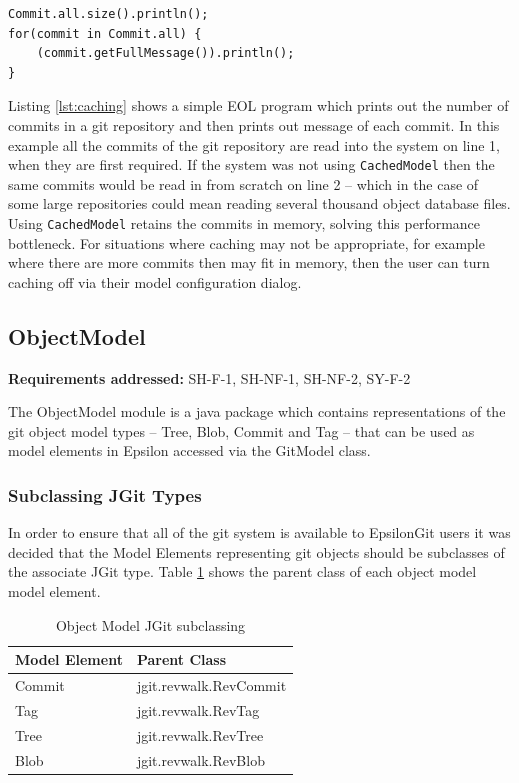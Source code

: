 \documentclass[11pt]{book}
\newcommand{\code}[1]{\texttt{#1}}
\begin{document}
\begin{lstlisting}[caption=EOL Code benefiting from caching, label=lst:caching]
Commit.all.size().println();
for(commit in Commit.all) {
	(commit.getFullMessage()).println();
}
\end{lstlisting}

Listing \ref{lst:caching} shows a simple EOL program which prints out the number of commits in a git repository and then prints out message of each commit. In this example all the commits of the git repository are read into the system on line 1, when they are first required. If the system was not using \code{CachedModel} then the same commits would be read in from scratch on line 2 -- which in the case of some large repositories could mean reading several thousand object database files. Using \code{CachedModel} retains the commits in memory, solving this performance bottleneck. For situations where caching may not be appropriate, for example where there are more commits then may fit in memory, then the user can turn caching off via their model configuration dialog.

\subsection{ObjectModel}
\begin{tcolorbox}
\textbf{Requirements addressed:}  SH-F-1, SH-NF-1, SH-NF-2, SY-F-2
\end{tcolorbox}
The ObjectModel module is a java package which contains representations of the git object model types -- Tree, Blob, Commit and Tag -- that can be used as model elements in Epsilon accessed via the GitModel class. 

\subsubsection{Subclassing JGit Types}
In order to ensure that all of the git system is available to EpsilonGit users it was decided that the Model Elements representing git objects should be subclasses of the associate JGit type. Table \ref{tab:subclassing} shows the parent class of each object model model element.

\begin{table}[H]
\centering
\begin{longtable}{|p{7.5cm}|p{7.5cm}|}
\hline
\textbf{Model Element} & \textbf{Parent Class}  \\ \hline
Commit 	& jgit.revwalk.RevCommit \\ \hline
Tag 	& jgit.revwalk.RevTag \\ \hline
Tree 	& jgit.revwalk.RevTree \\ \hline
Blob 	& jgit.revwalk.RevBlob \\ \hline
\end{longtable}
\caption{Object Model JGit subclassing}
\label{tab:subclassing}
\end{table}
\end{document}
